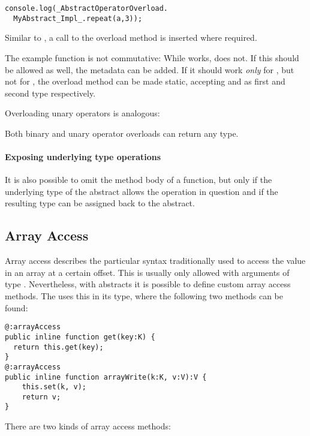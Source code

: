 \begin{lstlisting}
console.log(_AbstractOperatorOverload.
  MyAbstract_Impl_.repeat(a,3));
\end{lstlisting}
Similar to , a call to the overload method is inserted where required.

The example  function is not commutative: While  works,  does not. If this should be allowed as well, the  metadata can be added. If it should work \emph{only} for , but not for , the overload method can be made static, accepting  and  as first and second type respectively.

Overloading unary operators is analogous:

Both binary and unary operator overloads can return any type.

\paragraph{Exposing underlying type operations}

It is also possible to omit the method body of a  function, but only if the underlying type of the abstract allows the operation in question and if the resulting type can be assigned back to the abstract.




\subsection{Array Access}
\label{types-abstract-array-access}

Array access describes the particular syntax traditionally used to access the value in an array at a certain offset. This is usually only allowed with arguments of type . Nevertheless, with abstracts it is possible to define custom array access methods. The  uses this in its  type, where the following two methods can be found:

\begin{lstlisting}
@:arrayAccess
public inline function get(key:K) {
  return this.get(key);
}
@:arrayAccess
public inline function arrayWrite(k:K, v:V):V {
	this.set(k, v);
	return v;
}
\end{lstlisting}
There are two kinds of array access methods:

